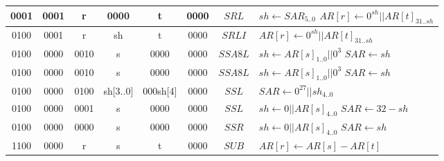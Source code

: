 \begin{longtable}{llllllllllllllllllllllll  p{1cm}  p{6cm} | }
        \multicolumn{4}{|c|}{0001} & \multicolumn{4}{c|}{0001} & \multicolumn{4}{c|}{r} & \multicolumn{4}{c|}{0000} & \multicolumn{4}{c|}{t} & \multicolumn{4}{c|}{0000} & \multicolumn{1}{c|}{$SRL$} & $sh \leftarrow SAR_{5..0}$ \newline $AR[r] \leftarrow 0^{sh} || AR[t]_{31..sh}$ \\ \hline        
        \multicolumn{4}{|c|}{0100} & \multicolumn{4}{c|}{0001} & \multicolumn{4}{c|}{r} & \multicolumn{4}{c|}{sh} & \multicolumn{4}{c|}{t} & \multicolumn{4}{c|}{0000} & \multicolumn{1}{c|}{$SRLI$} & $AR[r] \leftarrow 0^{sh} || AR[t]_{31..sh}$ \\ \hline
        \multicolumn{4}{|c|}{0100} & \multicolumn{4}{c|}{0000} & \multicolumn{4}{c|}{0010} & \multicolumn{4}{c|}{s} & \multicolumn{4}{c|}{0000} & \multicolumn{4}{c|}{0000} & \multicolumn{1}{c|}{$SSA8L$} & $sh \leftarrow AR[s]_{1..0} || 0^3$ \newline $SAR \leftarrow sh$ \\ \hline
        \multicolumn{4}{|c|}{0100} & \multicolumn{4}{c|}{0000} & \multicolumn{4}{c|}{0010} & \multicolumn{4}{c|}{s} & \multicolumn{4}{c|}{0000} & \multicolumn{4}{c|}{0000} & \multicolumn{1}{c|}{$SSA8L$} & $sh \leftarrow AR[s]_{1..0} || 0^3$ \newline $SAR \leftarrow sh$ \\ \hline
        \multicolumn{4}{|c|}{0100} & \multicolumn{4}{c|}{0000} & \multicolumn{4}{c|}{0100} & \multicolumn{4}{c|}{sh[3..0]} & \multicolumn{4}{c|}{000sh[4]} & \multicolumn{4}{c|}{0000} & \multicolumn{1}{c|}{$SSL$} & $SAR \leftarrow 0^{27} || sh_{4..0}$ \\ \hline
        \multicolumn{4}{|c|}{0100} & \multicolumn{4}{c|}{0000} & \multicolumn{4}{c|}{0001} & \multicolumn{4}{c|}{s} & \multicolumn{4}{c|}{0000} & \multicolumn{4}{c|}{0000} & \multicolumn{1}{c|}{$SSL$} & $sh \leftarrow 0 || AR[s]_{4..0}$ \newline $SAR \leftarrow 32 - sh$ \\ \hline
        \multicolumn{4}{|c|}{0100} & \multicolumn{4}{c|}{0000} & \multicolumn{4}{c|}{0000} & \multicolumn{4}{c|}{s} & \multicolumn{4}{c|}{0000} & \multicolumn{4}{c|}{0000} & \multicolumn{1}{c|}{$SSR$} & $sh \leftarrow 0 || AR[s]_{4..0}$ \newline $SAR \leftarrow sh$ \\ \hline
		\multicolumn{4}{|c|}{1100} & \multicolumn{4}{c|}{0000} & \multicolumn{4}{c|}{r} & \multicolumn{4}{c|}{s} & \multicolumn{4}{c|}{t} & \multicolumn{4}{c|}{0000} & \multicolumn{1}{c|}{$SUB$} & $AR[r] \leftarrow AR[s] - AR[t]$ \\ \hline        

\end{longtable}
